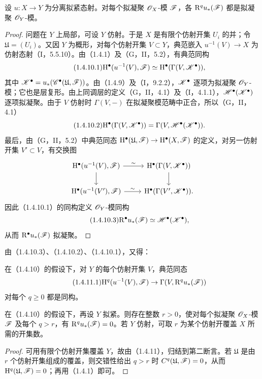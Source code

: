 设 $u:X\to Y$ 为分离拟紧态射。对每个拟凝聚 $\mathscr O_X$-模 $\mathscr F$，各 $\mathrm R^qu_*(\mathscr F)$ 都是拟凝聚 $\mathscr O_Y$-模。
\begin{proof}
问题在 $Y$ 上局部，可设 $Y$ 仿射。于是 $X$ 是有限个仿射开集 $U_i$ 的并；令 $\mathfrak U=(U_i)$。又因 $Y$ 为概形，对每个仿射开集 $V\subset Y$，典范嵌入 $u^{-1}(V)\to X$ 为仿射态射（I，5.5.10）。由（1.4.1）及（G，II，5.2），有典范同构
\begin{equation}\tag{1.4.10.1}
\mathrm H^\bullet(u^{-1}(V),\mathscr F)\simeq\mathrm H^\bullet(\Gamma(V,\mathscr K^\bullet)),
\end{equation}
其中 $\mathscr K^\bullet=u_*(\mathscr C^\bullet(\mathfrak U,\mathscr F))$。由（1.4.9）及（I，9.2.2），$\mathscr K^\bullet$ 逐项为拟凝聚 $\mathscr O_Y$-模；它也是层复形。由上同调层的定义（G，II，4.1）及（I，4.1.1），$\mathscr H^\bullet(\mathscr K^\bullet)$ 逐项拟凝聚。由于 $V$ 仿射时 $\Gamma(V,-)$ 在拟凝聚模范畴中正合，所以（G，II，4.1）
\begin{equation}\tag{1.4.10.2}
\mathrm H^\bullet(\Gamma(V,\mathscr K^\bullet))=\Gamma(V,\mathscr H^\bullet(\mathscr K^\bullet)).
\end{equation}
最后，由（G，II，5.2）中典范同态 $\mathrm H^\bullet(\mathfrak U,\mathscr F)\to\mathrm H^\bullet(X,\mathscr F)$ 的定义，对另一仿射开集 $V'\subset V$，有交换图
\[
\begin{tikzcd}
\mathrm H^\bullet(u^{-1}(V),\F)\arrow[r,"\sim"]\arrow[d]&\mathrm H^\bullet(\Gamma(V,\K^\bullet))\arrow[d]\\
\mathrm H^\bullet(u^{-1}(V'),\F)\arrow[r,"\sim"]&\mathrm H^\bullet(\Gamma(V',\K^\bullet)).
\end{tikzcd}
\]
因此（1.4.10.1）的同构定义 $\mathscr O_Y$-模同构
\begin{equation}\tag{1.4.10.3}
\mathrm R^\bullet u_*(\mathscr F)\simeq\mathscr H^\bullet(\mathscr K^\bullet),
\end{equation}
从而 $\mathrm R^\bullet u_*(\mathscr F)$ 拟凝聚。
\end{proof}
由（1.4.10.3）、（1.4.10.2）、（1.4.10.1），又得：

在（1.4.10）的假设下，对 $Y$ 的每个仿射开集 $V$，典范同态
\begin{equation}\tag{1.4.11.1}
\mathrm H^q(u^{-1}(V),\mathscr F)\to\Gamma(V,\mathrm R^qu_*(\mathscr F))
\end{equation}
对每个 $q\geq0$ 都是同构。

在（1.4.10）的假设下，再设 $Y$ 拟紧。则存在整数 $r>0$，使对每个拟凝聚 $\mathscr O_X$-模 $\mathscr F$ 及每个 $q>r$，有 $\mathrm R^qu_*(\mathscr F)=0$。若 $Y$ 仿射，可取 $r$ 为某个仿射开覆盖 $X$ 所需的开集数。
\begin{proof}
可用有限个仿射开集覆盖 $Y$，故由（1.4.11），归结到第二断言。若 $\mathfrak U$ 是由 $r$ 个仿射开集组成的覆盖，则交错性给出 $q>r$ 时 $C^q(\mathfrak U,\mathscr F)=0$，从而 $\mathrm H^q(\mathfrak U,\mathscr F)=0$；再用（1.4.1）即可。
\end{proof}

